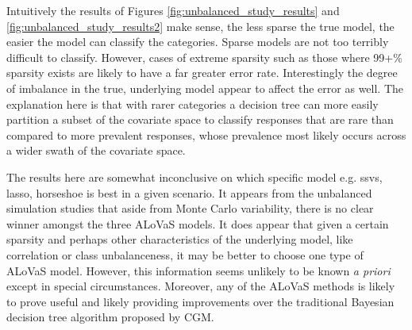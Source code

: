 
Intuitively the results of Figures \ref{fig:unbalanced_study_results} and \ref{fig:unbalanced_study_results2} make sense, the less sparse the true model, the easier the model can classify the categories. Sparse models are not too terribly difficult to classify. However, cases of extreme sparsity such as those where 99+\% sparsity exists are likely to have a far greater error rate. Interestingly the degree of imbalance in the true, underlying model appear to affect the error as well. The explanation here is that with rarer categories a decision tree can more easily partition a subset of the covariate space to classify responses that are rare than compared to more prevalent responses, whose prevalence most likely occurs across a wider swath of the covariate space. 

The results here are somewhat inconclusive on which specific model e.g. ssvs, lasso, horseshoe is best in a given scenario. It appears from the unbalanced simulation studies that aside from Monte Carlo variability, there is no clear winner amongst the three ALoVaS models. It does appear that given a certain sparsity and perhaps other characteristics of the underlying model, like correlation or class unbalanceness, it may be better to choose one type of ALoVaS model. However, this information seems unlikely to be known \emph{a priori} except in special circumstances. Moreover, any of the ALoVaS methods is likely to prove useful and likely providing improvements over the traditional Bayesian decision tree algorithm proposed by CGM. 

